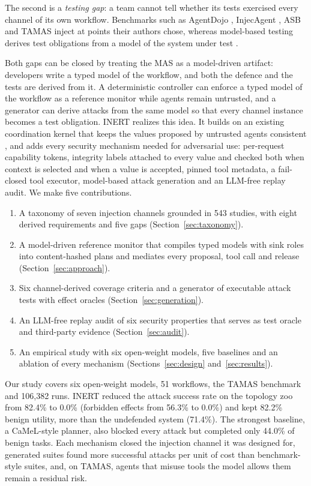 \documentclass[pdflatex,sn-mathphys-num]{sn-jnl}
\theoremstyle{thmstyleone}%
\theoremstyle{thmstyletwo}%
\theoremstyle{thmstylethree}%
\newcommand{\NCorpus}{543}
\begin{document}
The second is a \emph{testing gap}: a team cannot tell whether its tests exercised every channel of its own workflow. Benchmarks such as AgentDojo \citep{debenedetti2024agentdojo}, InjecAgent \citep{zhan2024injecagent}, ASB \citep{zhang2025asb} and TAMAS \citep{kavathekar2025tamas} inject at points their authors chose, whereas model-based testing derives test obligations from a model of the system under test \citep{utting2012taxonomy,felderer2016mbst}.

Both gaps can be closed by treating the MAS as a model-driven artifact: developers write a typed model of the workflow, and both the defence and the tests are derived from it. A deterministic controller can enforce a typed model of the workflow as a reference monitor \citep{anderson1972planning} while agents remain untrusted, and a generator can derive attacks from the same model so that every channel instance becomes a test obligation. INERT realizes this idea. It builds on an existing coordination kernel that keeps the values proposed by untrusted agents consistent \citep{vgc2026repo}, and adds every security mechanism needed for adversarial use: per-request capability tokens, integrity labels attached to every value and checked both when context is selected and when a value is accepted, pinned tool metadata, a fail-closed tool executor, model-based attack generation and an LLM-free replay audit. We make five contributions.
\begin{enumerate}
\item A taxonomy of seven injection channels grounded in \NCorpus{} studies, with eight derived requirements and five gaps (Section~\ref{sec:taxonomy}).
\item A model-driven reference monitor that compiles typed models with sink roles into content-hashed plans and mediates every proposal, tool call and release (Section~\ref{sec:approach}).
\item Six channel-derived coverage criteria and a generator of executable attack tests with effect oracles (Section~\ref{sec:generation}).
\item An LLM-free replay audit of six security properties that serves as test oracle and third-party evidence (Section~\ref{sec:audit}).
\item An empirical study with six open-weight models, five baselines and an ablation of every mechanism (Sections~\ref{sec:design} and~\ref{sec:results}).
\end{enumerate}

Our study covers six open-weight models, 51 workflows, the TAMAS benchmark and 106{,}382 runs. INERT reduced the attack success rate on the topology zoo from 82.4\% to 0.0\% (forbidden effects from 56.3\% to 0.0\%) and kept 82.2\% benign utility, more than the undefended system (71.4\%). The strongest baseline, a CaMeL-style planner, also blocked every attack but completed only 44.0\% of benign tasks. Each mechanism closed the injection channel it was designed for, generated suites found more successful attacks per unit of cost than benchmark-style suites, and, on TAMAS, agents that misuse tools the model allows them remain a residual risk.
\end{document}
